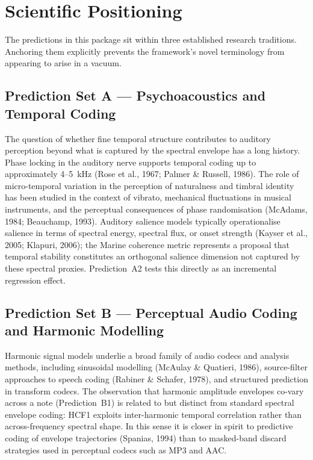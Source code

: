 \documentclass[11pt, a4paper]{article}
\begin{document}
\section{Scientific Positioning}

The predictions in this package sit within three established research traditions.
Anchoring them explicitly prevents the framework's novel terminology from appearing
to arise in a vacuum.

\subsection{Prediction Set A — Psychoacoustics and Temporal Coding}

The question of whether fine temporal structure contributes to auditory perception
beyond what is captured by the spectral envelope has a long history.  Phase locking
in the auditory nerve supports temporal coding up to approximately 4–5~kHz (Rose
et al., 1967; Palmer \& Russell, 1986).  The role of micro-temporal variation in
the perception of naturalness and timbral identity has been studied in the context
of vibrato, mechanical fluctuations in musical instruments, and the perceptual
consequences of phase randomisation (McAdams, 1984; Beauchamp, 1993).  Auditory
salience models typically operationalise salience in terms of spectral energy,
spectral flux, or onset strength (Kayser et al., 2005; Klapuri, 2006); the
Marine coherence metric represents a proposal that temporal stability constitutes
an orthogonal salience dimension not captured by these spectral proxies.
Prediction~A2 tests this directly as an incremental regression effect.

\subsection{Prediction Set B — Perceptual Audio Coding and Harmonic Modelling}

Harmonic signal models underlie a broad family of audio codecs and analysis
methods, including sinusoidal modelling (McAulay \& Quatieri, 1986), source-filter
approaches to speech coding (Rabiner \& Schafer, 1978), and structured prediction
in transform codecs.  The observation that harmonic amplitude envelopes co-vary
across a note (Prediction~B1) is related to but distinct from standard spectral
envelope coding: HCF1 exploits inter-harmonic temporal correlation rather than
across-frequency spectral shape.  In this sense it is closer in spirit to
predictive coding of envelope trajectories (Spanias, 1994) than to masked-band
discard strategies used in perceptual codecs such as MP3 and AAC.
\end{document}
